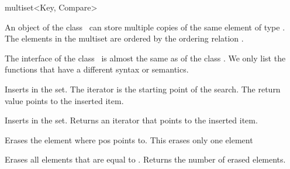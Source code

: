 
\ccHtmlNoClassLinks
\begin{ccClassTemplate} {multiset<Key, Compare>}


\ccDefinition
An object of the class \ccClassTemplateName\ can store multiple copies
of the same element of type .  The elements in the
multiset are ordered by the ordering relation .

The interface of the class \ccClassTemplateName\ is almost the same as of
the class . We only list the functions 
that have a different syntax or semantics.

\ccHtmlLinksOff
{}
\ccHtmlLinksOn

\ccTypes
{}



\ccOperations
{}
{Inserts  in the set. The iterator  is the starting 
 point of  the search.  The return value points to the inserted item.}

{Inserts  in the set. Returns an iterator that points to the 
 inserted item.}

{Erases the element where pos points to. This erases only one element}

{Erases all  elements that are equal to . Returns the number
 of erased elements.}

\end{ccClassTemplate} 
